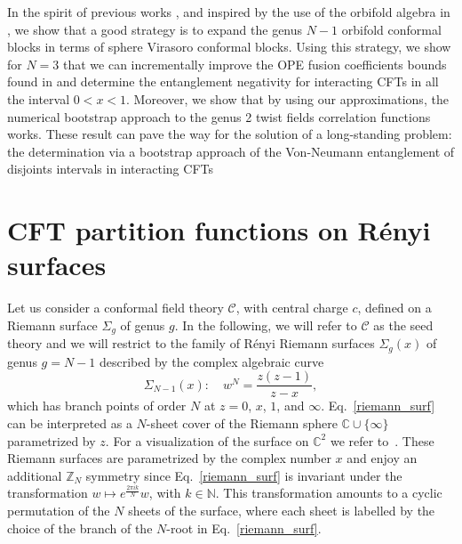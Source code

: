 \documentclass[a4paper,11pt]{article}
\begin{document}
In the spirit of previous works \cite{Rajabpour, Ruggiero}, and inspired by the use of the orbifold algebra in \cite{Dupic}, we show that a good strategy is to expand the genus $N-1$ orbifold conformal blocks in terms of sphere Virasoro conformal blocks.
Using this strategy, we show for $N=3$ that we can incrementally improve  the OPE fusion coefficients bounds found in \cite{Collier} and determine the entanglement negativity for interacting CFTs in all the interval $0<x<1$. Moreover, we show that by using  our approximations, the numerical bootstrap approach to the genus 2 twist fields correlation functions works. These result can pave the way for the solution of a long-standing problem: the determination via a bootstrap approach of the Von-Neumann entanglement of disjoints intervals in interacting CFTs
\section{CFT partition functions on R\'enyi surfaces}
Let us consider a conformal field theory $\mathcal{C}$, with central charge 
$c$, defined on a Riemann surface $\Sigma_g$ of genus $g$. In the following, 
we will refer to $\mathcal{C}$ as the seed theory and we will restrict to the 
family of R\'enyi Riemann surfaces $\Sigma_g(x)$ of genus $g=N-1$ described 
by the  complex algebraic curve
\begin{equation}\label{riemann_surf}
\Sigma_{N-1}(x): \quad  w^N=\frac{z(z-1)}{z-x},
\end{equation}
which has branch points of order $N$ at $z=0$, $x$, $1$, and $\infty$. 
Eq.~\eqref{riemann_surf} can be interpreted as a $N$-sheet cover of the Riemann sphere $\mathbb C\cup \{\infty\}$ parametrized by $z$. For a visualization of the surface on $\mathbb C^2$ we refer to~\cite{Dubrovin}. These Riemann surfaces are parametrized by  
the complex number $x$ and enjoy an additional $\mathbb{Z}_N$ symmetry since 
Eq.~\eqref{riemann_surf} is invariant under the transformation 
$w\mapsto e^{\frac{2\pi i k}{N}}w$, with $k\in\mathbb{N}$. 
This transformation amounts to a cyclic permutation of the $N$ sheets of the surface, where each sheet is labelled by the choice of the branch of the $N$-root in Eq.~\eqref{riemann_surf}. 
\end{document}
